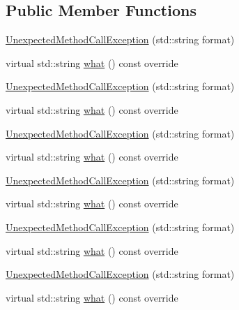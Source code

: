 \subsection*{Public Member Functions}
\begin{DoxyCompactItemize}
\item 
\mbox{\hyperlink{structfakeit_1_1UnexpectedMethodCallException_a9c8737b3fe74c4a9d2cbe151bd05194b}{Unexpected\+Method\+Call\+Exception}} (std\+::string format)
\item 
virtual std\+::string \mbox{\hyperlink{structfakeit_1_1UnexpectedMethodCallException_aabd833b1856e1cf842d2eafc3abf0a0e}{what}} () const override
\item 
\mbox{\hyperlink{structfakeit_1_1UnexpectedMethodCallException_a9c8737b3fe74c4a9d2cbe151bd05194b}{Unexpected\+Method\+Call\+Exception}} (std\+::string format)
\item 
virtual std\+::string \mbox{\hyperlink{structfakeit_1_1UnexpectedMethodCallException_aabd833b1856e1cf842d2eafc3abf0a0e}{what}} () const override
\item 
\mbox{\hyperlink{structfakeit_1_1UnexpectedMethodCallException_a9c8737b3fe74c4a9d2cbe151bd05194b}{Unexpected\+Method\+Call\+Exception}} (std\+::string format)
\item 
virtual std\+::string \mbox{\hyperlink{structfakeit_1_1UnexpectedMethodCallException_aabd833b1856e1cf842d2eafc3abf0a0e}{what}} () const override
\item 
\mbox{\hyperlink{structfakeit_1_1UnexpectedMethodCallException_a9c8737b3fe74c4a9d2cbe151bd05194b}{Unexpected\+Method\+Call\+Exception}} (std\+::string format)
\item 
virtual std\+::string \mbox{\hyperlink{structfakeit_1_1UnexpectedMethodCallException_aabd833b1856e1cf842d2eafc3abf0a0e}{what}} () const override
\item 
\mbox{\hyperlink{structfakeit_1_1UnexpectedMethodCallException_a9c8737b3fe74c4a9d2cbe151bd05194b}{Unexpected\+Method\+Call\+Exception}} (std\+::string format)
\item 
virtual std\+::string \mbox{\hyperlink{structfakeit_1_1UnexpectedMethodCallException_aabd833b1856e1cf842d2eafc3abf0a0e}{what}} () const override
\item 
\mbox{\hyperlink{structfakeit_1_1UnexpectedMethodCallException_a9c8737b3fe74c4a9d2cbe151bd05194b}{Unexpected\+Method\+Call\+Exception}} (std\+::string format)
\item 
virtual std\+::string \mbox{\hyperlink{structfakeit_1_1UnexpectedMethodCallException_aabd833b1856e1cf842d2eafc3abf0a0e}{what}} () const override

\end{DoxyCompactItemize}
